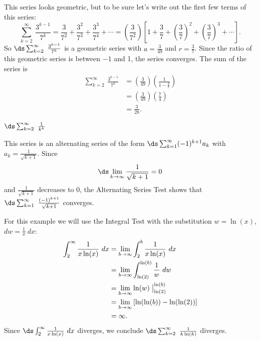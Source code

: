 \begin{activitySolution}
\item This series looks geometric, but to be sure let's write out the first few terms of this series:
\[ \sum_{k=2}^{\infty} \ \frac{3^{k-1}}{7^k} = \frac{3}{7^2} + \frac{3^2}{7^3} + \frac{3^3}{7^4} + \cdots = \left( \frac{3}{7^2} \right) \left[1 + \frac{3}{7} + \left( \frac{3}{7} \right)^2 + \left( \frac{3}{7} \right)^3 + \cdots \right].\]
So $\ds \sum_{k=2}^{\infty} \ \frac{3^{k-1}}{7^k}$ is a geometric series with $a = \frac{3}{49}$ and $r = \frac{3}{7}$. Since the ratio of this geometric series is between $-1$ and 1, the series converges. The sum of the series is
\begin{align*}
\sum_{k=2}^{\infty} \ \frac{3^{k-1}}{7^k} &= \left(\frac{3}{49}\right) \left(\frac{1}{1-\frac{3}{7}} \right) \\
    &= \left(\frac{3}{49}\right)\left(\frac{7}{4}\right) \\
    &= \frac{3}{28}.
\end{align*}

\item $\ds \sum_{k=2}^{\infty} \ \frac{1}{k^k}$

\item This series is an alternating series of the form $\ds \sum_{k=1}^{\infty} (-1)^{k+1} a_k$ with $a_k = \frac{1}{\sqrt{k+1}}$. Since
\[\ds \lim_{k \to \infty} \frac{1}{\sqrt{k+1}} = 0\]
and $\frac{1}{\sqrt{k+1}}$ decreases to 0, the Alternating Series Test shows that $\ds \sum_{k=1}^{\infty} \ \frac{(-1)^{k+1}}{\sqrt{k+1}}$ converges.

\item For this example we will use the Integral Test with the substitution $w = \ln(x)$, $dw = \frac{1}{x} \ dx$:
\begin{align*}
\displaystyle \int_2^{\infty} \frac{1}{x \ln(x)} \ dx &= \lim_{b \to \infty} \int_2^b \frac{1}{x \ln(x)} \ dx \\
	&= \displaystyle \lim_{b \to \infty} \int_{\ln(2)}^{\ln(b)} \frac{1}{w} \ dw \\
	&= \displaystyle \lim_{b \to \infty} \ln(w) \bigm|_{\ln(2)}^{\ln(b)}  \\
	&= \displaystyle \lim_{b \to \infty} \left[ \ln(\ln(b)) - \ln(\ln(2)) \right]  \\
	&= \infty.
\end{align*}
Since $\ds \int_2^{\infty} \frac{1}{x \ln(x)} \ dx$ diverges, we conclude $\ds \sum_{k=2}^{\infty} \ \frac{1}{k \ln(k)}$ diverges.


\end{activitySolution}
